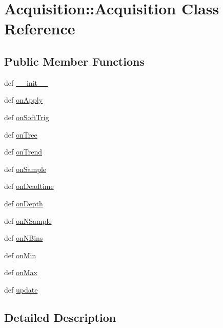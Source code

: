 \hypertarget{classAcquisition_1_1Acquisition}{
\section{Acquisition::Acquisition Class Reference}
\label{classAcquisition_1_1Acquisition}
}
\subsection*{Public Member Functions}
\begin{DoxyCompactItemize}
\item 
def \hyperlink{classAcquisition_1_1Acquisition_a01a30848ca3a0dd4e0e0d137b6c2b514}{\_\-\_\-init\_\-\_\-}
\item 
def \hyperlink{classAcquisition_1_1Acquisition_a25a5eb642eae7543e1803ca50c38f9dc}{onApply}
\item 
def \hyperlink{classAcquisition_1_1Acquisition_a5f7822cf53373ff7405944f1d9861759}{onSoftTrig}
\item 
def \hyperlink{classAcquisition_1_1Acquisition_a807185c8bcc9a144e7923a03a9d5ba1a}{onTree}
\item 
def \hyperlink{classAcquisition_1_1Acquisition_ade4cfb94d7d3a43e7ba448425a8fb098}{onTrend}
\item 
def \hyperlink{classAcquisition_1_1Acquisition_ac06fcb6d14ab4269f58f50cfde00283f}{onSample}
\item 
def \hyperlink{classAcquisition_1_1Acquisition_a8dcc93fe78f971ad8a39547edac81bf0}{onDeadtime}
\item 
def \hyperlink{classAcquisition_1_1Acquisition_a238e848f9561abc3000bc762ed291db4}{onDepth}
\item 
def \hyperlink{classAcquisition_1_1Acquisition_ac17393aa0cb7b6d48c482820ac4ecd26}{onNSample}
\item 
def \hyperlink{classAcquisition_1_1Acquisition_a82d37801e9581783b2b08ed36ea37eb9}{onNBins}
\item 
def \hyperlink{classAcquisition_1_1Acquisition_aa6892d520baf0639d63433430e14e838}{onMin}
\item 
def \hyperlink{classAcquisition_1_1Acquisition_ae0168d4b34ac27c32e84af4a506efd8a}{onMax}
\item 
def \hyperlink{classAcquisition_1_1Acquisition_a52a017e2e8ce5fdd0734ef1ca38eb3b3}{update}
\end{DoxyCompactItemize}


\subsection{Detailed Description}


